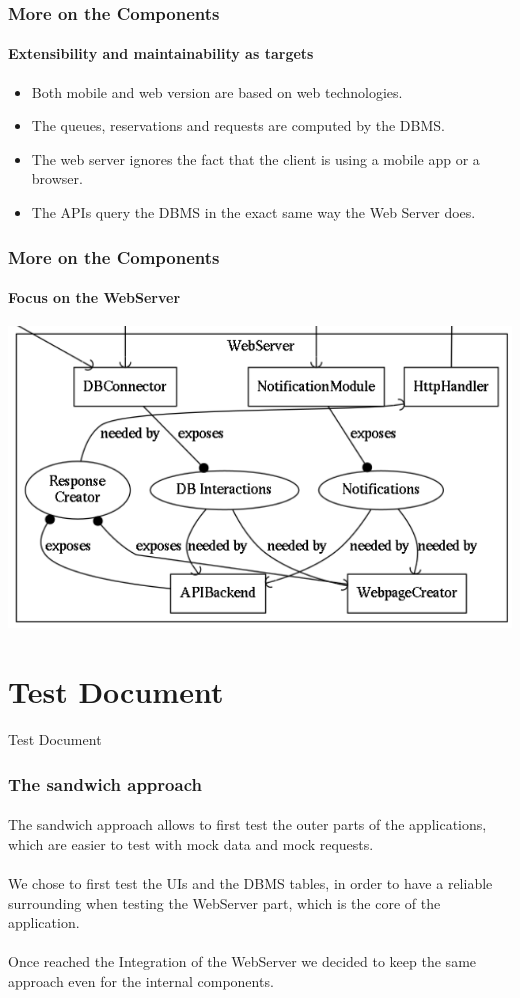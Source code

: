 \documentclass[10pt,xcolor={usenames,dvipsnames}]{beamer}
\begin{document}
\begin{frame}
	\frametitle{More on the Components}
	\framesubtitle{Extensibility and maintainability as targets}
	\begin{itemize}
		\item Both mobile and web version are based on web technologies.
		\item The queues, reservations and requests are computed by the DBMS.
		\item The web server ignores the fact that the client is using a mobile app or a browser.
		\item The APIs query the DBMS in the exact same way the Web Server does.
	\end{itemize}
\end{frame}
\begin{frame}
	\frametitle{More on the Components}
	\framesubtitle{Focus on the WebServer}
	\begin{center}
		\includegraphics[width=\textwidth,height=\textheight,keepaspectratio]{dot/Webserver}
	\end{center}

\end{frame}

\section[Section]{Test Document}
\begin{frame}
	\begin{center}
		Test Document	
	\end{center}
\end{frame}
\begin{frame}
	\frametitle{The sandwich approach}
	\framesubtitle{}
	The sandwich approach allows to first test the outer parts of the applications, which are easier to test with mock data and mock requests.\\
	\-\\
	We chose to first test the UIs and the DBMS tables, in order to have a reliable surrounding when testing the WebServer part, which is the core of the application.\\
	\-\\
	Once reached the Integration of the WebServer we decided to keep the same approach even for the internal components.
\end{frame}
\end{document}
